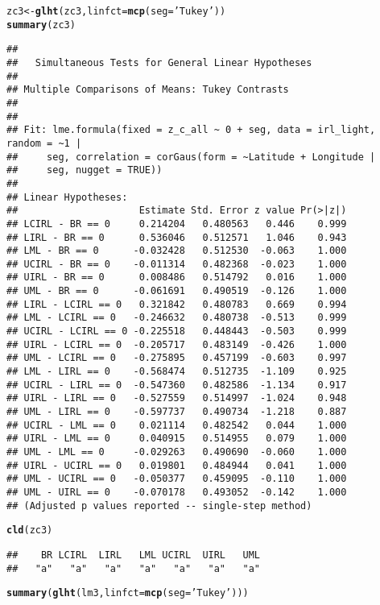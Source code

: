 \documentclass[letterpaper,12pt]{article}\usepackage[]{graphicx}\usepackage[]{color}
\makeatletter
\newcommand{\hlstr}[1]{\textcolor[rgb]{0.192,0.494,0.8}{#1}}%
\newcommand{\hlstd}[1]{\textcolor[rgb]{0.345,0.345,0.345}{#1}}%
\newcommand{\hlkwb}[1]{\textcolor[rgb]{0.69,0.353,0.396}{#1}}%
\newcommand{\hlkwc}[1]{\textcolor[rgb]{0.333,0.667,0.333}{#1}}%
\newcommand{\hlkwd}[1]{\textcolor[rgb]{0.737,0.353,0.396}{\textbf{#1}}}%
\newenvironment{kframe}{%
 \def\at@end@of@kframe{}%
 \ifinner\ifhmode%
  \def\at@end@of@kframe{\end{minipage}}%
  \begin{minipage}{\columnwidth}%
 \fi\fi%
 \def\FrameCommand##1{\hskip\@totalleftmargin \hskip-\fboxsep
 \colorbox{shadecolor}{##1}\hskip-\fboxsep
     \hskip-\linewidth \hskip-\@totalleftmargin \hskip\columnwidth}%
 \MakeFramed {\advance\hsize-\width
   \@totalleftmargin\z@ \linewidth\hsize
   \@setminipage}}%
 {\par\unskip\endMakeFramed%
 \at@end@of@kframe}
\newenvironment{knitrout}{}{} %
\makeatother
\begin{document}
\begin{knitrout}
\begin{kframe}
\begin{alltt}
\hlstd{zc3} \hlkwb{<-} \hlkwd{glht}\hlstd{(zc3,} \hlkwc{linfct} \hlstd{=} \hlkwd{mcp}\hlstd{(}\hlkwc{seg} \hlstd{=} \hlstr{'Tukey'}\hlstd{))}
\hlkwd{summary}\hlstd{(zc3)}
\end{alltt}
\begin{verbatim}
## 
## 	 Simultaneous Tests for General Linear Hypotheses
## 
## Multiple Comparisons of Means: Tukey Contrasts
## 
## 
## Fit: lme.formula(fixed = z_c_all ~ 0 + seg, data = irl_light, random = ~1 | 
##     seg, correlation = corGaus(form = ~Latitude + Longitude | 
##     seg, nugget = TRUE))
## 
## Linear Hypotheses:
##                     Estimate Std. Error z value Pr(>|z|)
## LCIRL - BR == 0     0.214204   0.480563   0.446    0.999
## LIRL - BR == 0      0.536046   0.512571   1.046    0.943
## LML - BR == 0      -0.032428   0.512530  -0.063    1.000
## UCIRL - BR == 0    -0.011314   0.482368  -0.023    1.000
## UIRL - BR == 0      0.008486   0.514792   0.016    1.000
## UML - BR == 0      -0.061691   0.490519  -0.126    1.000
## LIRL - LCIRL == 0   0.321842   0.480783   0.669    0.994
## LML - LCIRL == 0   -0.246632   0.480738  -0.513    0.999
## UCIRL - LCIRL == 0 -0.225518   0.448443  -0.503    0.999
## UIRL - LCIRL == 0  -0.205717   0.483149  -0.426    1.000
## UML - LCIRL == 0   -0.275895   0.457199  -0.603    0.997
## LML - LIRL == 0    -0.568474   0.512735  -1.109    0.925
## UCIRL - LIRL == 0  -0.547360   0.482586  -1.134    0.917
## UIRL - LIRL == 0   -0.527559   0.514997  -1.024    0.948
## UML - LIRL == 0    -0.597737   0.490734  -1.218    0.887
## UCIRL - LML == 0    0.021114   0.482542   0.044    1.000
## UIRL - LML == 0     0.040915   0.514955   0.079    1.000
## UML - LML == 0     -0.029263   0.490690  -0.060    1.000
## UIRL - UCIRL == 0   0.019801   0.484944   0.041    1.000
## UML - UCIRL == 0   -0.050377   0.459095  -0.110    1.000
## UML - UIRL == 0    -0.070178   0.493052  -0.142    1.000
## (Adjusted p values reported -- single-step method)
\end{verbatim}
\begin{alltt}
\hlkwd{cld}\hlstd{(zc3)}
\end{alltt}
\begin{verbatim}
##    BR LCIRL  LIRL   LML UCIRL  UIRL   UML 
##   "a"   "a"   "a"   "a"   "a"   "a"   "a"
\end{verbatim}
\begin{alltt}
\hlkwd{summary}\hlstd{(}\hlkwd{glht}\hlstd{(lm3,} \hlkwc{linfct} \hlstd{=} \hlkwd{mcp}\hlstd{(}\hlkwc{seg} \hlstd{=} \hlstr{'Tukey'}\hlstd{)))}

\end{alltt}
\end{kframe}
\end{knitrout}
\end{document}
